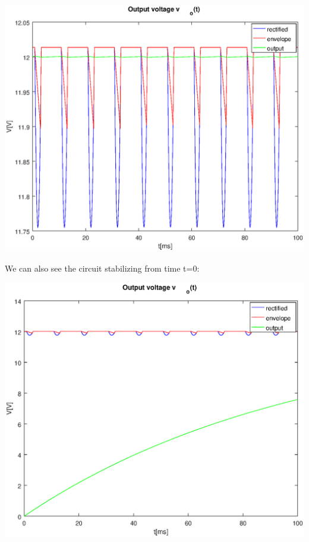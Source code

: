 \includegraphics[width=1\linewidth]{voutput.eps}

We can also see the circuit stabilizing from time t=0:

\includegraphics[width=1\linewidth]{voutput_init.eps}

